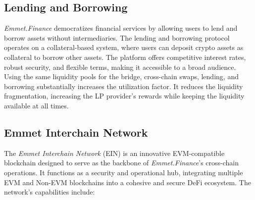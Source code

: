 \documentclass[12pt, a4paper]{article}
\begin{document}
\subsection{Lending and Borrowing}

\textit{Emmet.Finance} democratizes financial services by allowing users to lend and borrow assets without intermediaries. The lending and borrowing protocol operates on a collateral-based system, where users can deposit crypto assets as collateral to borrow other assets. The platform offers competitive interest rates, robust security, and flexible terms, making it accessible to a broad audience. Using the same liquidity pools for the bridge, cross-chain swaps, lending, and borrowing substantially increases the utilization factor. It reduces the liquidity fragmentation, increasing the LP provider’s rewards while keeping the liquidity available at all times.

\subsection{Emmet Interchain Network}

The \textit{Emmet Interchain Network} (EIN) is an innovative EVM-compatible blockchain designed to serve as the backbone of \textit{Emmet.Finance}'s cross-chain operations. It functions as a security and operational hub, integrating multiple EVM and Non-EVM blockchains into a cohesive and secure DeFi ecosystem. The network's capabilities include:
\end{document}
